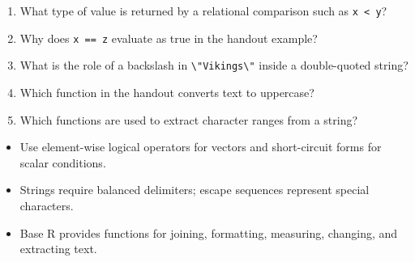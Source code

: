 \begin{quickcheck}
\begin{enumerate}
  \item What type of value is returned by a relational comparison such as \texttt{x < y}?
  \item Why does \texttt{x == z} evaluate as true in the handout example?
  \item What is the role of a backslash in \texttt{\textbackslash"Vikings\textbackslash"} inside a double-quoted string?
  \item Which function in the handout converts text to uppercase?
  \item Which functions are used to extract character ranges from a string?
\end{enumerate}
\end{quickcheck}

\begin{chapterrecap}
\begin{itemize}
  \item Use element-wise logical operators for vectors and short-circuit forms for scalar conditions.
  \item Strings require balanced delimiters; escape sequences represent special characters.
  \item Base R provides functions for joining, formatting, measuring, changing, and extracting text.
\end{itemize}
\end{chapterrecap}
